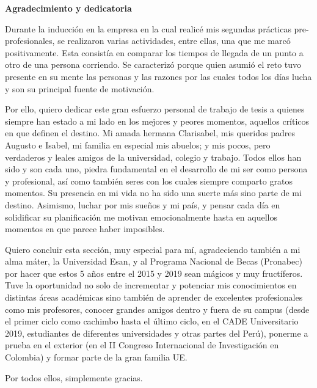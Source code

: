 \begin{center}
	{\Large \bfseries  Agradecimiento y dedicatoria}
\end{center}
\vspace{0.5cm}

Durante la inducción en la empresa en la cual realicé mis segundas prácticas pre-profesionales, se realizaron varias actividades, entre ellas, una que me marcó positivamente. Esta consistía en comparar los tiempos de llegada de un punto a otro de una persona corriendo. Se caracterizó porque quien asumió el reto tuvo presente en su mente las personas y las razones por las cuales todos los días lucha y son su principal fuente de motivación.

Por ello, quiero dedicar este gran esfuerzo personal de trabajo de tesis a quienes siempre han estado a mi lado en los mejores y peores momentos, aquellos críticos en que definen el destino. Mi amada hermana Clarisabel, mis queridos padres Augusto e Isabel, mi familia en especial mis abuelos; y mis pocos, pero verdaderos y leales amigos de la universidad, colegio y trabajo. Todos ellos han sido y son cada uno, piedra fundamental en el desarrollo de mi ser como persona y profesional, así como también seres con los cuales siempre comparto gratos momentos. Su presencia en mi vida no ha sido una suerte más sino parte de mi destino.
Asimismo, luchar por mis sueños y mi país, y pensar cada día en solidificar su planificación me motivan emocionalmente hasta en aquellos momentos en que parece haber imposibles.

Quiero concluir esta sección, muy especial para mí, agradeciendo también a mi alma máter, la Universidad Esan, y al Programa Nacional de Becas (Pronabec) por hacer que estos 5 años entre el 2015 y 2019 sean mágicos y muy fructíferos. Tuve la oportunidad no solo de incrementar y potenciar mis conocimientos en distintas áreas académicas sino también de aprender de excelentes profesionales como mis profesores, conocer grandes amigos dentro y fuera de su campus (desde el primer ciclo como cachimbo hasta el último ciclo, en el CADE Universitario 2019, estudiantes de diferentes universidades y otras partes del Perú), ponerme a prueba en el exterior (en el II Congreso Internacional de Investigación en Colombia) y formar parte de la gran familia UE.

Por todos ellos, simplemente gracias.
\newline


